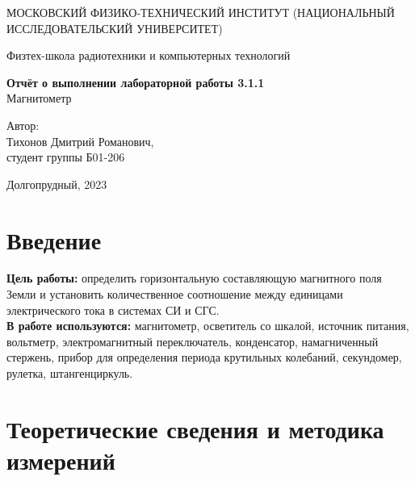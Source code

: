 \documentclass[a4paper, 12pt]{article}
\begin{document}
    \begin{titlepage}
	\begin{center}
            {\large МОСКОВСКИЙ ФИЗИКО-ТЕХНИЧЕСКИЙ ИНСТИТУТ (НАЦИОНАЛЬНЫЙ ИССЛЕДОВАТЕЛЬСКИЙ УНИВЕРСИТЕТ)}
	\end{center}
 
	\begin{center}
		{\large Физтех-школа радиотехники и компьютерных технологий}
	\end{center}
	
	\vspace{8cm}
	{\LARGE
		\begin{center}
                {\bf Отчёт о выполнении лабораторной работы 3.1.1}\\
                Магнитометр
		\end{center}
	}
	\vspace{5cm}
	\begin{flushright}
		{\Large Автор:\\ Тихонов Дмитрий Романович, \\
			\vspace{0.2cm}
			студент группы Б01-206}
	\end{flushright}
	\vspace{5cm}
	\begin{center}
		\Large Долгопрудный, 2023
	\end{center}
    \end{titlepage}


    \section{Введение}

    \noindent \textbf{Цель работы:} определить горизонтальную составляющую магнитного поля Земли и установить количественное соотношение между единицами электрического тока в системах СИ и СГС. \\

    \noindent \textbf{В работе используются:} магнитометр, осветитель со шкалой, источник питания, вольтметр, электромагнитный переключатель, конденсатор, намагниченный стержень, прибор для определения периода крутильных колебаний, секундомер, рулетка, штангенциркуль.
    
    \section{Теоретические сведения и методика измерений}
\end{document}
